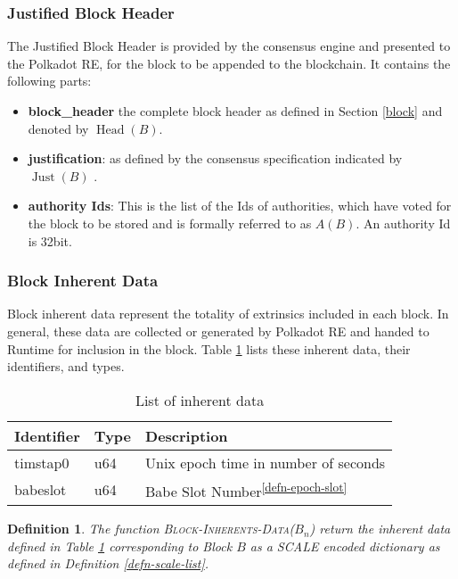 \documentclass{book}
\newcommand{\tmname}[1]{\textsc{#1}}
\newcommand{\tmop}[1]{\ensuremath{\operatorname{#1}}}
\newcommand{\tmrsup}[1]{\textsuperscript{#1}}
\newcommand{\tmsamp}[1]{\textsf{#1}}
\newcommand{\tmstrong}[1]{\textbf{#1}}
\newcommand{\tmtextbf}[1]{{\bfseries{#1}}}
\newcommand{\tmtextsc}[1]{{\scshape{#1}}}
\newcommand{\tmtextsf}[1]{{\sffamily{#1}}}
\newtheorem{definition}{Definition}
\providecommand{\tmname}[1]{\tmtextsc{#1}}
\providecommand{\tmop}[1]{\ensuremath{\mathrm{#1}}}
\providecommand{\tmsamp}[1]{\tmtextsf{#1}}
\providecommand{\tmstrong}[1]{\tmtextbf{#1}}
\providecommand{\tmtextbf}[1]{\tmtextbf{#1}}
\newtheorem{definition}{Definition}
\begin{document}
\subsubsection{Justified Block Header}

The Justified Block Header is provided by the consensus engine and presented
to the Polkadot RE, for the block to be appended to the blockchain. It
contains the following parts:
\begin{itemize}
  \item {\tmstrong{{\tmsamp{{\tmstrong{block\_header}}}}}} the complete block
  header as defined in Section \ref{block} and denoted by $\tmop{Head} (B)$.
  
  \item {\tmstrong{{\tmsamp{justification}}}}: as defined by the consensus
  specification indicated by $\tmop{Just} (B)$ {}.
  
  \item {\tmstrong{{\tmsamp{authority Ids}}}}: This is the list of the Ids of
  authorities, which have voted for the block to be stored and is formally
  referred to as $A (B)$. An authority Id is 32bit.
\end{itemize}

\subsubsection{Block Inherent Data}

Block inherent data represent the totality of extrinsics included in each
block. In general, these data are collected or generated by Polkadot RE and
handed to Runtime for inclusion in the block. Table \ref{tabl-inherent-data}
lists these inherent data, their identifiers, and types.

\begin{table}[h]
  \begin{tabular}{lll}
    \hline
    Identifier & Type  & Description\\
    \hline
    timstap0 & u64 & Unix epoch time in number of seconds\\
    babeslot & u64 & Babe Slot Number\tmrsup{\ref{defn-epoch-slot}}\\
    \hline
  \end{tabular}
  \caption{\label{tabl-inherent-data}List of inherent data}
\end{table}

\begin{definition}
  \label{defn-func-inherent-data}The function
  {\tmname{Block-Inherents-Data($B_n$)}} return the inherent data defined in
  Table \ref{tabl-inherent-data} corresponding to Block $B$ as a SCALE encoded
  dictionary as defined in Definition \ref{defn-scale-list}.
\end{definition}
\end{document}
